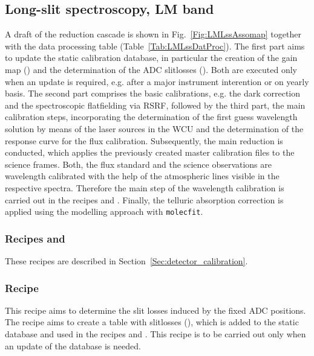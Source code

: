 \clearpage
\subsection{Long-slit spectroscopy, LM band}
\label{ssec:recipes_lss_lm}

A draft of the reduction cascade is shown in
Fig.~\ref{Fig:LMLssAssomap} together with the data processing table
(Table~\ref{Tab:LMLssDatProc}). The first part aims to update the static calibration database, in particular the creation of the gain map () and the determination of the \ac{ADC} slitlosses (). Both are executed only when an update is required, e.g. after a major instrument interention or on yearly basis. The second part comprises the basic
calibrations, e.g. the 
dark correction and the spectroscopic flatfielding via \ac{RSRF}, followed by the third part, the main calibration steps, incorporating the determination of the first guess wavelength solution by means of the laser sources in the \ac{WCU} and the determination of the response curve for the flux calibration. Subsequently, the main reduction is conducted, which applies the previously created master calibration files to the science frames. Both, the flux standard and the science observations are wavelength calibrated with the help of the atmospheric lines visible in the respective spectra. Therefore the main step of the wavelength calibration is carried out in the recipes  and . Finally, the telluric absorption correction is applied using the modelling approach with \texttt{molecfit}.


\subsubsection{Recipes  and }
These recipes are described in Section~\ref{Sec:detector_calibration}.

\subsubsection{Recipe }
This recipe aims to determine the slit losses induced by the fixed \ac{ADC} positions. The recipe aims to create a table with slitlosses (), which is added to the static database and used in the recipes  and . This recipe is to be carried out only when an update of the database is needed.

